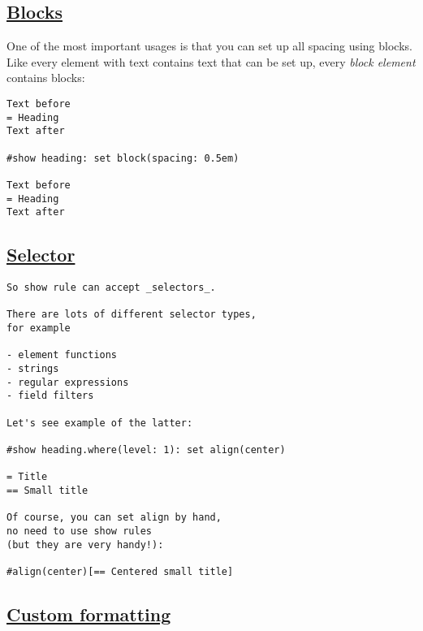 \pandocbounded{}

\subsection{\texorpdfstring{\hyperref[blocks]{Blocks}}{Blocks}}\label{blocks}

One of the most important usages is that you can set up all spacing
using blocks. Like every element with text contains text that can be set
up, every \emph{block element} contains blocks:

\begin{verbatim}
Text before
= Heading
Text after

#show heading: set block(spacing: 0.5em)

Text before
= Heading
Text after
\end{verbatim}

\pandocbounded{}

\subsection{\texorpdfstring{\hyperref[selector]{Selector}}{Selector}}\label{selector}

\begin{verbatim}
So show rule can accept _selectors_.

There are lots of different selector types,
for example

- element functions
- strings
- regular expressions
- field filters

Let's see example of the latter:

#show heading.where(level: 1): set align(center)

= Title
== Small title

Of course, you can set align by hand,
no need to use show rules
(but they are very handy!):

#align(center)[== Centered small title]
\end{verbatim}

\pandocbounded{}

\subsection{\texorpdfstring{\hyperref[custom-formatting]{Custom
formatting}}{Custom formatting}}\label{custom-formatting}

